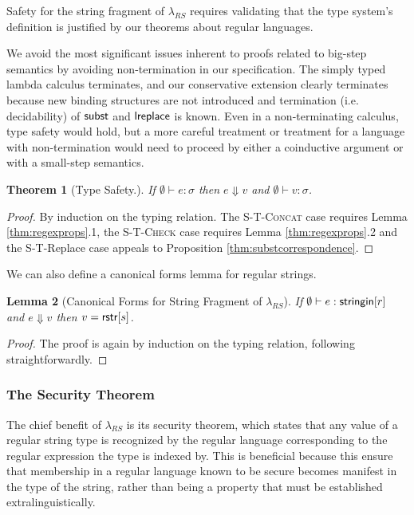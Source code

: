 \documentclass[9pt]{sig-alternate}
\newtheorem{thm}{Theorem}
\newtheorem{lem}[thm]{Lemma}
\theoremstyle{definition}
\newcommand{\lambdas}{\lambda_{RS}}
\newcommand{\stringin}[1]{{\sf stringin}[#1]}
\newcommand{\sreduces}{ \Downarrow }
\begin{document}
Safety for the string fragment of $\lambdas$ requires validating that the type system's definition is justified
by our theorems about regular languages.

We avoid the most significant issues inherent to proofs related to big-step semantics by avoiding non-termination in our specification.
The simply typed lambda calculus terminates, and our conservative extension clearly
terminates because new binding structures are not introduced and termination (i.e. decidability) of ${\sf subst}$ and ${\sf lreplace}$ is known. Even in a non-terminating calculus, type safety would hold, but a more careful treatment or treatment for a language with non-termination would need to proceed by either a coinductive argument \cite{coinductionoo} or  with a small-step semantics.

\begin{thm}[Type Safety.] \label{thm:typesafety}
  If $\emptyset \vdash e : \sigma$ 
  then $e \sreduces v$ and $\emptyset \vdash v : \sigma$.
\end{thm}
\begin{proof}
By induction on the typing relation.
The \textsc{S-T-Concat} case requires Lemma \ref{thm:regexprops}.1, the \textsc{S-T-Check} case requires Lemma \ref{thm:regexprops}.2 
and the S-T-Replace case appeals to Proposition \ref{thm:substcorrespondence}.
\end{proof}

We can also define a canonical forms lemma for regular strings. 

\begin{lem}[Canonical Forms for String Fragment of $\lambdas$]\label{thm:cfs}
  If $\emptyset \vdash e : \stringin{r}$ and $e \sreduces v$ then $v={\sf rstr}[s]$. 
\end{lem}
\begin{proof}
The proof is again by induction on the typing relation, following straightforwardly.
\end{proof}



\subsubsection{The Security Theorem}\label{sec:securitythm}

The chief benefit of $\lambdas$ is its security theorem, which states that any value of
a regular string type is recognized by the regular language corresponding to the regular expression the type is indexed by.
This is beneficial because this ensure that membership in a regular language known to be secure becomes manifest in the type of the string, rather than being a property that must be established extralinguistically. 
\end{document}
